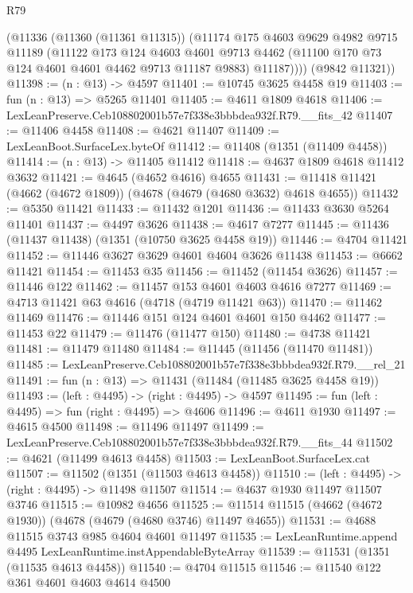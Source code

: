 \begin{lexlean}{R79}
\begin{coremodule}
        (@11336
          (@11360 (@11361 @11315))
          (@11174
            @175
            @4603
            @9629
            @4982
            @9715
            @11189
            (@11122
              @173
              @124
              @4603
              @4601
              @9713
              @4462
              (@11100 @170 @73 @124 @4601 @4601 @4462 @9713 @11187 @9883)
              @11187))))
      (@9842 @11321))
@11398 := (n : @13) -> @4597
@11401 := @10745 @3625 @4458 @19
@11403 := fun (n : @13) => @5265 @11401
@11405 := @4611 @1809 @4618
@11406 := LexLeanPreserve.Ceb108802001b57e7f338e3bbbdea932f.R79.__fits_42
@11407 := @11406 @4458
@11408 := @4621 @11407
@11409 := LexLeanBoot.SurfaceLex.byteOf
@11412 := @11408 (@1351 (@11409 @4458))
@11414 := (n : @13) -> @11405 @11412
@11418 := @4637 @1809 @4618 @11412 @3632
@11421 := @4645 (@4652 @4616) @4655
@11431 := @11418 @11421 (@4662 (@4672 @1809)) (@4678 (@4679 (@4680 @3632) @4618 @4655))
@11432 := @5350 @11421
@11433 := @11432 @1201
@11436 := @11433 @3630 @5264 @11401
@11437 := @4497 @3626
@11438 := @4617 @7277
@11445 := @11436 (@11437 @11438) (@1351 (@10750 @3625 @4458 @19))
@11446 := @4704 @11421
@11452 := @11446 @3627 @3629 @4601 @4604 @3626 @11438
@11453 := @6662 @11421
@11454 := @11453 @35
@11456 := @11452 (@11454 @3626)
@11457 := @11446 @122
@11462 := @11457 @153 @4601 @4603 @4616 @7277
@11469 := @4713 @11421 @63 @4616 (@4718 (@4719 @11421 @63))
@11470 := @11462 @11469
@11476 := @11446 @151 @124 @4601 @4601 @150 @4462
@11477 := @11453 @22
@11479 := @11476 (@11477 @150)
@11480 := @4738 @11421
@11481 := @11479 @11480
@11484 := @11445 (@11456 (@11470 @11481))
@11485 := LexLeanPreserve.Ceb108802001b57e7f338e3bbbdea932f.R79.__rel_21
@11491 := fun (n : @13) => @11431 (@11484 (@11485 @3625 @4458 @19))
@11493 := (left : @4495) -> (right : @4495) -> @4597
@11495 := fun (left : @4495) => fun (right : @4495) => @4606
@11496 := @4611 @1930
@11497 := @4615 @4500
@11498 := @11496 @11497
@11499 := LexLeanPreserve.Ceb108802001b57e7f338e3bbbdea932f.R79.__fits_44
@11502 := @4621 (@11499 @4613 @4458)
@11503 := LexLeanBoot.SurfaceLex.cat
@11507 := @11502 (@1351 (@11503 @4613 @4458))
@11510 := (left : @4495) -> (right : @4495) -> @11498 @11507
@11514 := @4637 @1930 @11497 @11507 @3746
@11515 := @10982 @4656
@11525 := @11514 @11515 (@4662 (@4672 @1930)) (@4678 (@4679 (@4680 @3746) @11497 @4655))
@11531 := @4688 @11515 @3743 @985 @4604 @4601 @11497
@11535 := LexLeanRuntime.append @4495 LexLeanRuntime.instAppendableByteArray
@11539 := @11531 (@1351 (@11535 @4613 @4458))
@11540 := @4704 @11515
@11546 := @11540 @122 @361 @4601 @4603 @4614 @4500

\end{coremodule}
\end{lexlean}

